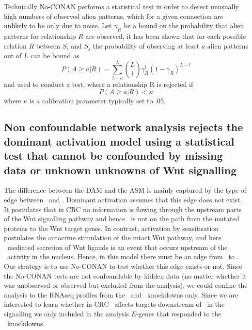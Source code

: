Technically No-CONAN performs a statistical test in order to detect unusually high numbers of observed alien patterns, which for a given connection are unlikely to be only due to noise. 
Let $\gamma_R$ be a bound on the probability that alien patterns for relationship $R$ are observed, it has been shown \cite{art:SadehMS2013} that for each possible relation $R$ between $S_i$ and $S_j$ the probability of observing at least $a$ alien patterns out of $L$ can be bound as
%
\begin{equation*}
P(A \ge a \vert R) = \sum_{l=a}^L \binom{L}{l} \gamma_R^l (1 - \gamma_R)^{L-l}
\end{equation*}
and used to conduct a test, where a relationship R is rejected if 
\begin{equation*}
P(A \ge a \vert R) < \kappa
\end{equation*}
%
where $\kappa$ is a calibration parameter typically set to .05.

\subsection*{Non confoundable network analysis rejects the dominant activation model using a statistical test that cannot be confounded by missing data or unknown unknowns of Wnt signalling}

The difference between the DAM and the ASM is mainly captured by the type of edge between \eviG~and \betaCatG. Dominant activation assumes that this edge does not exist. It postulates that in CRC no information is flowing through the upstream parts of the Wnt signalling pathway and hence \eviG~is not on the path from the mutated proteins to the Wnt target genes. In contrast, activation by sensitisation postulates the autocrine stimulation of the intact Wnt  pathway, and here \eviG~mediated secretion of Wnt ligands is an event that occurs upstream of the \betaCatG~activity in the nucleus. Hence, in this model there must be an edge from \eviG~to \betaCatG. Our strategy is to use No-CONAN to test whether this edge exists or not. Since the No-CONAN tests are not confoundable by hidden data (no matter whether it was unobserved or observed but excluded from the analysis), we could confine the analysis to the RNAseq profiles from the \eviG~and \betaCatG~knockdowns only. Since we are interested to learn whether in CRC \eviG~affects targets downstream of \betaCatG~in the signalling we only included in the analysis $E$-genes that responded to the \betaCatG~knockdowns.

